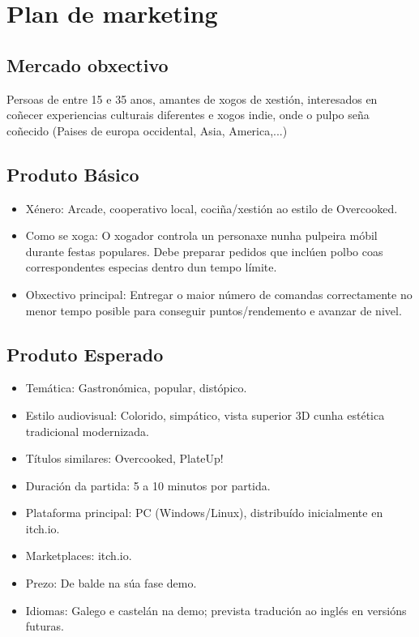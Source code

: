 \documentclass{report}  %
\begin{document}
\section{Plan de marketing}

\subsection{Mercado obxectivo}
Persoas de entre 15 e 35 anos, amantes de xogos de xestión, interesados en coñecer experiencias culturais diferentes e xogos indie, onde o pulpo seña coñecido (Paises de europa occidental, Asia, America,...)
\subsection{Produto Básico}
\begin{itemize}
    \item Xénero: Arcade, cooperativo local, cociña/xestión ao estilo de Overcooked.
    \item Como se xoga: O xogador controla un personaxe nunha pulpeira móbil durante festas populares. Debe preparar pedidos que inclúen polbo coas correspondentes especias dentro dun tempo límite.
    \item Obxectivo principal: Entregar o maior número de comandas correctamente no menor tempo posible para conseguir puntos/rendemento e avanzar de nivel.
\end{itemize}

\subsection{Produto Esperado}
\begin{itemize}
    \item Temática: Gastronómica, popular, distópico.
    \item Estilo audiovisual: Colorido, simpático, vista superior 3D cunha estética tradicional modernizada.
    \item Títulos similares: Overcooked, PlateUp!
    \item Duración da partida: 5 a 10 minutos por partida.
    \item Plataforma principal: PC (Windows/Linux), distribuído inicialmente en itch.io.
    \item Marketplaces: itch.io.
    \item Prezo: De balde na súa fase demo.
    \item Idiomas: Galego e castelán na demo; prevista tradución ao inglés en versións futuras.
\end{itemize}
\end{document}
